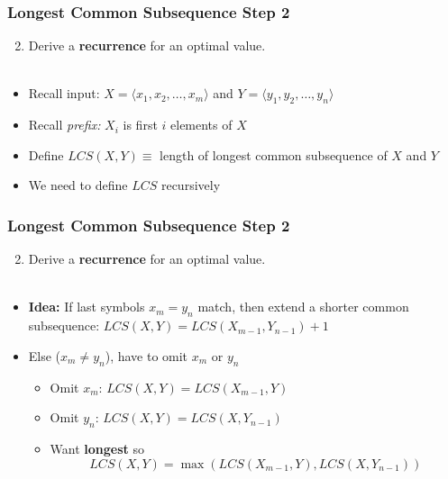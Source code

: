 \documentclass[10pt,aspectratio=169]{beamer}
\newcommand{\stanza}{ \\~\ }
\begin{document}
  \begin{frame} \frametitle{Longest Common Subsequence Step 2}
    \begin{enumerate}
      \setcounter{enumi}{1}
      \item Derive a \textbf{recurrence} for an optimal value.
      \stanza
    \end{enumerate}
    \begin{itemize}
      \item Recall input: $X=\langle x_1, x_2, \ldots, x_m \rangle$ and $Y=\langle y_1, y_2, \ldots, y_n \rangle$
      \item Recall \emph{prefix:} $X_i$ is first $i$ elements of $X$
      \item Define $LCS(X, Y) \equiv$ length of longest common subsequence of $X$ and $Y$
      \item We need to define $LCS$ recursively
      \end{itemize}

      \end{frame}
      \begin{frame} \frametitle{Longest Common Subsequence Step 2}
        \begin{enumerate}
          \setcounter{enumi}{1}
          \item Derive a \textbf{recurrence} for an optimal value.
          \stanza
        \end{enumerate}
        \begin{itemize}
          \item \textbf{Idea:} If last symbols $x_m=y_n$ match, then extend a shorter common subsequence:
            $LCS(X, Y) = LCS(X_{m-1}, Y_{n-1}) + 1$
          \item Else ($x_m \ne y_n$), have to omit $x_m$ or $y_n$
            \begin{itemize}
            \item Omit $x_m$: $LCS(X, Y) = LCS(X_{m-1}, Y)$
            \item Omit $y_n$: $LCS(X, Y) = LCS(X, Y_{n-1})$
            \item Want \textbf{longest} so 
            \[ LCS(X, Y) = \max(LCS(X_{m-1}, Y), LCS(X, Y_{n-1})) \]
              \end{itemize}
          \end{itemize}
    \end{frame}
\end{document}
